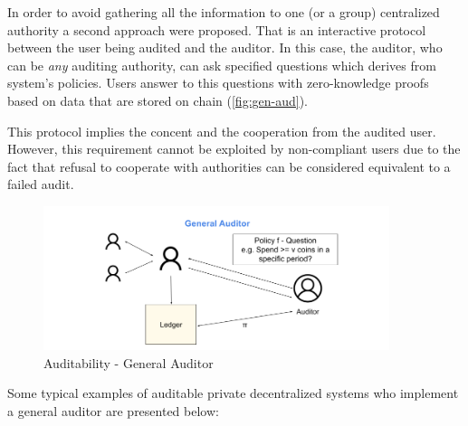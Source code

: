 In order to avoid gathering all the information to one (or a group) centralized authority a second approach were proposed. That is an interactive protocol between the user being audited and the auditor. In this case, the auditor, who can be \textit{any} auditing authority, can ask specified questions which derives from system's policies. Users answer to this questions with zero-knowledge proofs based on data that are stored on chain (\autoref{fig:gen-aud}).

This protocol implies the concent and the cooperation from the audited user. However, this requirement cannot be exploited by non-compliant users due to the fact that refusal to cooperate with authorities can be considered equivalent to a failed audit.

\begin{figure}
    \centering
    \includegraphics[width=0.9\textwidth]{images/privacy/Auditability in blockchain - General Auditor.png}
    \caption{Auditability - General Auditor}
    \label{fig:gen-aud}
\end{figure}

Some typical examples of auditable private decentralized systems who implement a general auditor are presented below:


% 
